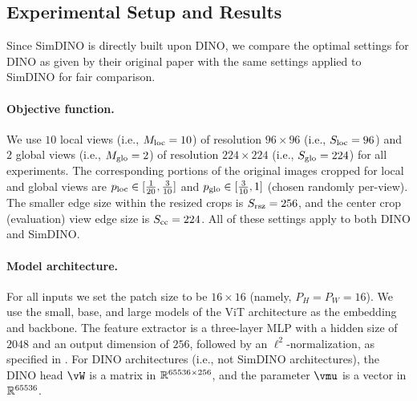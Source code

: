 \documentclass[../../book-main.tex]{subfiles}
\begin{document}
\subsection{Experimental Setup and Results} \label{sub:contrastive_learning_experiment_results}

Since SimDINO is directly built upon DINO, we compare the optimal settings for DINO as given by their original paper \citep{caron2021emerging} with the same settings applied to SimDINO for fair comparison. 

\paragraph{Objective function.} We use \(10\) local views (i.e., \(M_{\mathrm{loc}} = 10\)) of resolution \(96 \times 96\) (i.e., \(S_{\mathrm{loc}} = 96\)) and \(2\) global views (i.e., \(M_{\mathrm{glo}} = 2\)) of resolution \(224 \times 224\) (i.e., \(S_{\mathrm{glo}} = 224\)) for all experiments. The corresponding portions of the original images cropped for local and global views are \(p_{\mathrm{loc}} \in [\frac{1}{20}, \frac{3}{10}]\) and \(p_{\mathrm{glo}} \in [\frac{3}{10}, 1]\) (chosen randomly per-view). The smaller edge size within the resized crops is \(S_{\mathrm{rsz}} = 256\), and the center crop (evaluation) view edge size is \(S_{\mathrm{cc}} = 224\). All of these settings apply to both DINO and SimDINO.

\paragraph{Model architecture.} For all inputs we set the patch size to be \(16 \times 16\) (namely, \(P_{H} = P_{W} = 16\)). We use the small, base, and large models of the ViT \citep{dosovitskiy2020image} architecture as the embedding and backbone. The feature extractor is a three-layer MLP with a hidden size of \(2048\) and an output dimension of \(256\), followed by an \(\ell^{2}\)-normalization, as specified in . For DINO architectures (i.e., not SimDINO architectures), the DINO head \(\vW\) is a matrix in \(\mathbb{R}^{65536 \times 256}\), and the parameter \(\vmu\) is a vector in \(\mathbb{R}^{65536}\). 
\end{document}
